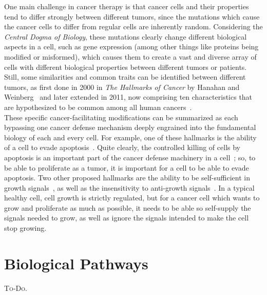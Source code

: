 \color{gray}One main challenge in cancer therapy is that cancer cells and their properties tend to differ strongly between different tumors, \color{black}since the mutations which cause the cancer cells to differ from regular cells are inherently random.
Considering the \emph{Central Dogma of Biology}, these mutations clearly change different biological aspects in a cell, such as gene expression (among other things like proteins being modified or misformed), which causes them to create a vast and diverse array of cells with different biological properties between different tumors or patients.\\
Still, some similarities and common traits can be identified between different tumors, as first done in 2000 in \textit{The Hallmarks of Cancer} by Hanahan and Weinberg~\cite{hallmarks-of-cancer} and later extended in 2011, now comprising ten characteristics that are hypothesized to be common among all human cancers~\cite{hallmarks-of-cancer-next-generation}.\\
These specific cancer-facilitating modifications can be summarized as each bypassing one cancer defense mechanism deeply engrained into the fundamental biology of each and every cell. For example, one of these hallmarks is the ability of a cell to evade apoptosis~\cite{hallmarks-of-cancer}. Quite clearly, the controlled killing of cells by apoptosis is an important part of the cancer defense machinery in a cell~\cite{apoptosis_in_cancer}; so, to be able to proliferate as a tumor, it is important for a cell to be able to evade apoptosis. Two other proposed hallmarks are the ability to be self-sufficient in growth signals~\cite{hallmarks-of-cancer}, as well as the insensitivity to anti-growth signals~\cite{hallmarks-of-cancer}. In a typical healthy cell, cell growth is strictly regulated, but for a cancer cell which wants to grow and proliferate as much as possible, it needs to be able so self-supply the signals needed to grow, as well as ignore the signals intended to make the cell stop growing.

\section{Biological Pathways}
\textsc{To-Do}.
